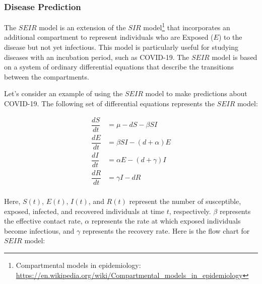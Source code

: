 \documentclass[13pt,a4paper]{report}
\begin{document}
\subsubsection{Disease Prediction}

The $SEIR$ model is an extension of the $SIR$ model\footnote{Compartmental models in epidemiology: \url{https://en.wikipedia.org/wiki/Compartmental_models_in_epidemiology}} that incorporates an additional compartment to represent individuals who are Exposed ($E$) to the disease but not yet infectious. This model is particularly useful for studying diseases with an incubation period, such as COVID-19. The $SEIR$ model is based on a system of ordinary differential equations that describe the transitions between the compartments.

Let's consider an example of using the $SEIR$ model to make predictions about COVID-19. The following set of differential equations represents the $SEIR$ model:

$$
\begin{aligned}
\dfrac{dS}{dt} &= \mu-dS-\beta S I\\[0.2cm]
\dfrac{dE}{dt} &= \beta S I - (d+\alpha) E\\[0.2cm]
\dfrac{dI}{dt} &= \alpha E - (d+\gamma) I\\[0.2cm]
\dfrac{dR}{dt} &= \gamma I - dR\\[0.2cm]
\end{aligned}
$$

Here, $S(t)$, $E(t)$, $I(t)$, and $R(t)$ represent the number of susceptible, exposed, infected, and recovered individuals at time $t$, respectively. $\beta$ represents the effective contact rate, $\alpha$ represents the rate at which exposed individuals become infectious, and $\gamma$ represents the recovery rate. Here is the flow chart for $SEIR$ model:

\usetikzlibrary{arrows.meta,positioning}
\begin{center}
\end{center}
\end{document}
